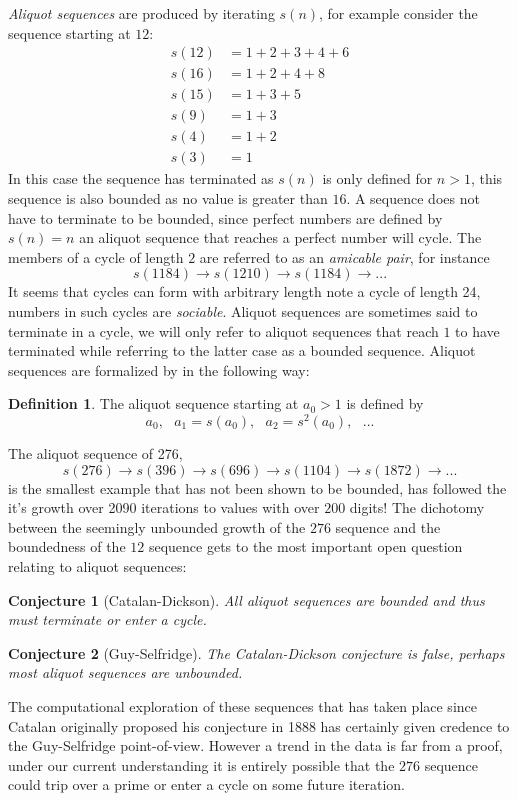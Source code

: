 \documentclass{article}
\theoremstyle{definition}
\newtheorem{definition}{Definition}[section]
\newtheorem{conjecture}{Conjecture}[section]
\begin{document}
\textit{Aliquot sequences} are produced by iterating $s(n)$, for example consider the sequence starting at $12$:
\begin{align*}
    s(12) & = 1 + 2 + 3 + 4 + 6 \\
    s(16) & = 1 + 2 + 4 + 8     \\
    s(15) & = 1 + 3 + 5         \\
    s(9)  & = 1 + 3             \\
    s(4)  & = 1 + 2             \\
    s(3)  & = 1
\end{align*}
In this case the sequence has terminated as $s(n)$ is only defined for $n > 1$, this sequence is also bounded as no value is greater than $16$. A sequence does not have to terminate to be bounded, since perfect numbers are defined by $s(n) = n$ an aliquot sequence that reaches a perfect number will cycle. The members of a cycle of length $2$ are referred to as an \textit{amicable pair}, for instance
$$s(1184) \to s(1210) \to s(1184) \to ...$$
It seems that cycles can form with arbitrary length \cite{chum_guy_jacobson_mosunov_2018} note a cycle of length 24, numbers in such cycles are \textit{sociable}. Aliquot sequences are sometimes said to terminate in a cycle, we will only refer to aliquot sequences that reach $1$ to have terminated while referring to the latter case as a bounded sequence. Aliquot sequences are formalized by \cite{bosma_kane_2010} in the following way:
%
\begin{definition}
    The aliquot sequence starting at $a_0 > 1$ is defined by
    $$a_0,\text{ }a_1 = s(a_0),\text{ }a_2 = s^2(a_0),\text{ }...$$
\end{definition}
%
The aliquot sequence of 276,
$$s(276) \rightarrow s(396) \rightarrow s(696) \rightarrow s(1104) \rightarrow s(1872)  \rightarrow ...$$
is the smallest example that has not been shown to be bounded, \cite{zimmermann_2016} has followed the it's growth over 2090 iterations to values with over $200$ digits! The dichotomy between the seemingly unbounded growth of the $276$ sequence and the boundedness of the $12$ sequence gets to the most important open question relating to aliquot sequences:
%
\begin{conjecture}[Catalan-Dickson]
    \textit{All aliquot sequences are bounded and thus must terminate or enter a cycle. \cite{catalan_1888}}
\end{conjecture}
%
\begin{conjecture}[Guy-Selfridge]
    \textit{The Catalan-Dickson conjecture is false, perhaps most aliquot sequences are unbounded. \cite{guy_selfridge_1975}}
\end{conjecture}
%
The computational exploration of these sequences that has taken place since Catalan originally proposed his conjecture in 1888 has certainly given credence to the Guy-Selfridge point-of-view. However a trend in the data is far from a proof, under our current understanding it is entirely possible that the $276$ sequence could trip over a prime or enter a cycle on some future iteration.
%
\end{document}
